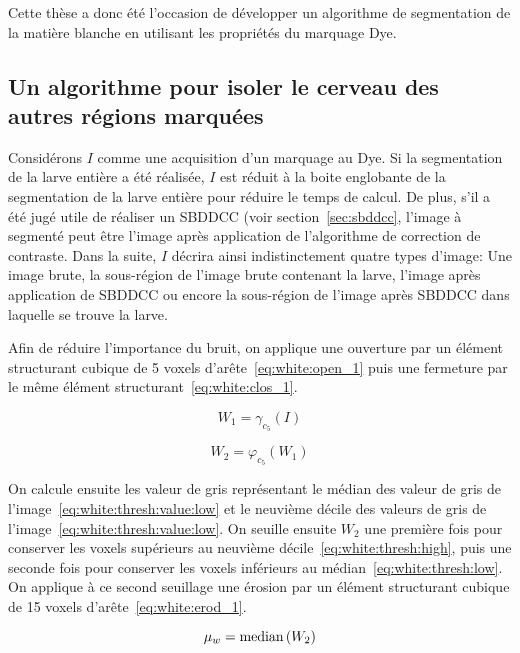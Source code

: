 \documentclass[\main/main.tex]{subfiles}
\begin{document}
%
Cette thèse a donc été l'occasion de développer un algorithme de segmentation de la matière blanche en utilisant les propriétés du marquage Dye.


\subsection{Un algorithme pour isoler le cerveau des autres régions marquées}

%
Considérons $I$ comme une acquisition d'un marquage au Dye.
%
Si la segmentation de la larve entière a été réalisée, $I$ est réduit à la boite englobante de la segmentation de la larve entière pour réduire le temps de calcul.
%
De plus, s'il a été jugé utile de réaliser un SBDDCC (voir section~\ref{sec:sbddcc}, l'image à segmenté peut être l'image après application de l'algorithme de correction de contraste.
%
Dans la suite, $I$ décrira ainsi indistinctement quatre types d'image:
Une image brute, la sous-région de l'image brute contenant la larve,
l'image après application de SBDDCC ou encore la sous-région de l'image après SBDDCC dans laquelle se trouve la larve.

%
Afin de réduire l'importance du bruit, on applique une ouverture par un élément structurant cubique de 5 voxels d'arête~\eqref{eq:white:open_1} puis une fermeture par le même élément structurant~\eqref{eq:white:clos_1}.

\begin{equation}
\label{eq:white:open_1}
    W_1 = \gamma_{c_5}(I)
\end{equation}

\begin{equation}
\label{eq:white:clos_1}
    W_2 = \varphi_{c_5}(W_1)
\end{equation}

%
On calcule ensuite les valeur de gris représentant le médian des valeur de gris de l'image~\eqref{eq:white:thresh:value:low} et le neuvième décile des valeurs de gris de l'image~\eqref{eq:white:thresh:value:low}.
%
On seuille ensuite $W_2$ une première fois pour conserver les voxels supérieurs au neuvième décile~\eqref{eq:white:thresh:high}, puis une seconde fois pour conserver les voxels inférieurs au médian~\eqref{eq:white:thresh:low}.
%
On applique à ce second seuillage une érosion par un élément structurant cubique de 15 voxels d'arête~\eqref{eq:white:erod_1}.

\begin{equation}
\label{eq:white:thresh:value:low}
    \mu_w = \operatorname{\textnormal{median}}{}(W_2)
\end{equation}
\end{document}
